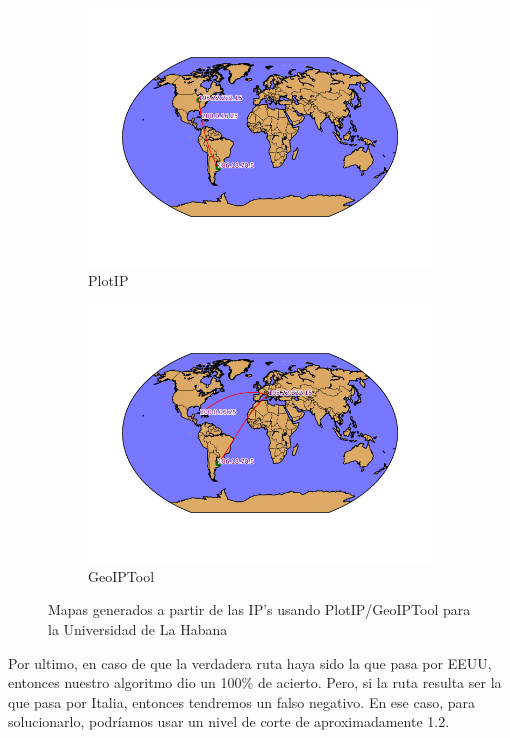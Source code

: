 \begin{figure}[ht]
	\begin{subfigure}[b]{0.5\textwidth}
		\centering
		\includegraphics[width=\linewidth]{imagenes/mapa_habana_plotip.png}
		\caption{PlotIP}
	\end{subfigure}
	\begin{subfigure}[b]{0.5\textwidth}
		\centering
		\includegraphics[width=\linewidth]{imagenes/mapa_habana_geoip.png}
		\caption{GeoIPTool}
	\end{subfigure}
	\caption{Mapas generados a partir de las IP's usando PlotIP/GeoIPTool para la Universidad de La Habana}
\end{figure}

Por ultimo, en caso de que la verdadera ruta haya sido la que pasa por EEUU, entonces
nuestro algoritmo dio un 100\% de acierto. Pero, si la ruta resulta ser la que pasa
por Italia, entonces tendremos un falso negativo. En ese caso, para solucionarlo, podríamos
usar un nivel de corte de aproximadamente 1.2.

